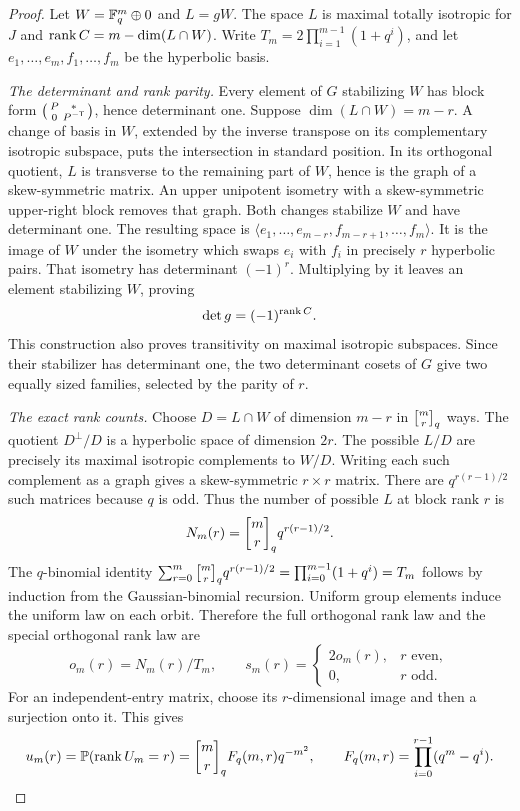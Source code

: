 \begin{proof}
Let $W=\mathbb{F}_q^m\oplus0$ and $L=gW$. The space $L$ is maximal totally isotropic
for $J$ and $\operatorname{rank} C=m-\dim(L\cap W)$. Write
$T_m=2\prod_{i=1}^{m-1}(1+q^i)$, and let $e_1,\dots,e_m,f_1,\dots,f_m$ be the
hyperbolic basis.

\emph{The determinant and rank parity.} Every element of $G$ stabilizing $W$
has block form
$\left(\begin{smallmatrix}P&*\\0&P^{-\mathsf{T}}\end{smallmatrix}\right)$, hence
determinant one. Suppose $\dim(L\cap W)=m-r$. A change of basis in $W$,
extended by the inverse transpose on its complementary isotropic subspace,
puts the intersection in standard position. In its orthogonal quotient, $L$
is transverse to the remaining part of $W$, hence is the graph of a
skew-symmetric matrix. An upper unipotent isometry with a skew-symmetric
upper-right block removes that graph. Both changes stabilize $W$ and have
determinant one. The resulting space is
$\langle e_1,\dots,e_{m-r},f_{m-r+1},\dots,f_m\rangle$. It is the image of
$W$ under the isometry which swaps $e_i$ with $f_i$ in precisely $r$
hyperbolic pairs. That isometry has determinant $(-1)^r$. Multiplying by it
leaves an element stabilizing $W$, proving
\begin{equation}\label{spn:eq:orthogonal-parity}
 \det g=(-1)^{\operatorname{rank} C}.
\end{equation}
This construction also proves transitivity on maximal isotropic subspaces.
Since their stabilizer has determinant one, the two determinant cosets of $G$
give two equally sized families, selected by the parity of $r$.

\emph{The exact rank counts.} Choose $D=L\cap W$ of dimension $m-r$ in
$\spnqbin{m}{r}{q}$ ways. The quotient $D^\perp/D$ is a hyperbolic space of
dimension $2r$. The possible $L/D$ are precisely its maximal isotropic
complements to $W/D$. Writing each such complement as a graph gives a
skew-symmetric $r\times r$ matrix. There are $q^{r(r-1)/2}$ such matrices
because $q$ is odd. Thus the number of possible $L$ at block rank $r$ is
\begin{equation}\label{spn:eq:orthogonal-subspace-count}
 N_m(r)=\spnqbin{m}{r}{q}q^{r(r-1)/2}.
\end{equation}
The $q$-binomial identity
$\sum_{r=0}^{m}\spnqbin{m}{r}{q}q^{r(r-1)/2}=\prod_{i=0}^{m-1}(1+q^i)=T_m$
follows by induction from the Gaussian-binomial recursion. Uniform group
elements induce the uniform law on each orbit. Therefore the full orthogonal
rank law and the special orthogonal rank law are
\[
 o_m(r)=N_m(r)/T_m,\qquad
 s_m(r)=\begin{cases}2o_m(r),&r\text{ even},\\0,&r\text{ odd}.\end{cases}
\]
For an independent-entry matrix, choose its $r$-dimensional image and then a
surjection onto it. This gives
\[
 u_m(r)=\spnP(\rank U_m=r)=\spnqbin{m}{r}{q}F_q(m,r)q^{-m^2},\qquad
 F_q(m,r)=\prod_{i=0}^{r-1}(q^m-q^i).
\]


\end{proof}
